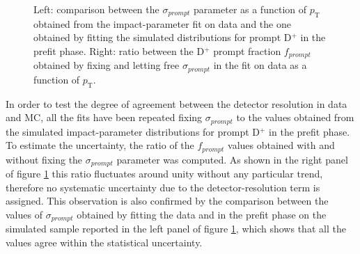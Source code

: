 \documentclass[b5paper,10pt,twoside,oldstyle,classica]{toptesi}
\newcommand{\pt}{p_\text{T}}
\begin{document}
\begin{figure}[b]
\begin{center}
\caption{Left: comparison between the $\sigma_{prompt}$ parameter as a function of $\pt$ obtained from the impact-parameter fit on data and the one obtained by fitting the simulated distributions for prompt D$^+$ in the prefit phase. Right: ratio between the D$^+$ prompt fraction $f_{prompt}$ obtained by fixing and letting free $\sigma_{prompt}$ in the fit on data as a function of $\pt$.}
\label{sigmaprompt_syst}
\end{center}
\end{figure}
In order to test the degree of agreement between the detector resolution in data and MC, all the fits have been repeated fixing $\sigma_{prompt}$ to the values obtained from the simulated impact-parameter distributions for prompt D$^+$ in the prefit phase. To estimate the uncertainty, the ratio of the $f_{prompt}$ values obtained with and without fixing the $\sigma_{prompt}$ parameter was computed. As shown in the right panel of figure \ref{sigmaprompt_syst} this ratio fluctuates around unity without any particular trend, therefore no systematic uncertainty due to the detector-resolution term is assigned. This observation is also confirmed by the comparison between the values of $\sigma_{prompt}$ obtained by fitting the data and in the prefit phase on the simulated sample reported in the left panel of figure \ref{sigmaprompt_syst}, which shows that all the values agree within the statistical uncertainty. 
\end{document}
